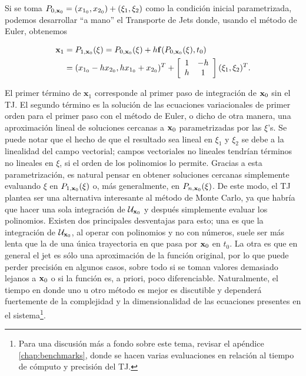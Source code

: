 Si se toma $P_{0,\mathbf{x}_0} = (x_{1_0},x_{2_0}) + (\xi_1,\xi_2)$ como la condición inicial parametrizada, podemos desarrollar ``a mano'' el Transporte de Jets donde, usando el método de Euler, obtenemos

\begin{align*}
\mathbf{x}_1 &= P_{1,\mathbf{x}_0}(\xi) = P_{0,\mathbf{x}_0}(\xi) + h \mathbf{f}(P_{0,\mathbf{x}_0}(\xi),t_0) \\
&= (x_{1_0} - h x_{2_0}, h x_{1_0} + x_{2_0} )^T + \left[ \begin{array}{cc}
 1 & -h  \\
h & 1  \\
\end{array} \right] (\xi_1,\xi_2)^T.
\end{align*} 

El primer término de $\mathbf{x}_1$ corresponde al primer paso de integración de $\mathbf{x}_0$ sin el TJ. El segundo término es la solución de las ecuaciones variacionales de primer orden para el primer paso con el método de Euler, o dicho de otra manera, una aproximación lineal de soluciones cercanas a $\mathbf{x}_0$ parametrizadas por las $\xi$'s. Se puede notar que el hecho de que el resultado sea lineal en $\xi_1$ y $\xi_2$ se debe a la linealidad del campo vectorial; campos vectoriales no lineales tendrían términos no lineales en $\xi$, si el orden de los polinomios lo permite. Gracias a esta parametrización, es natural pensar en obtener soluciones cercanas simplemente evaluando $\xi$ en $P_{1,\mathbf{x}_0}(\xi)$ o, más generalmente, en $P_{n,\mathbf{x}_0}(\xi)$. De este modo, el TJ plantea ser una alternativa interesante al método de Monte Carlo, ya que habría que hacer una sola integración de $\mathcal{U}_{\mathbf{x}_0}$ y después simplemente evaluar los polinomios. Existen dos principales desventajas para esto; una es que la integración de $\mathcal{U}_{\mathbf{x}_0}$, al operar con polinomios y no con números, suele ser más lenta que la de una única trayectoria en que pasa por $\mathbf{x}_0$ en $t_0$. La otra es que en general el jet es sólo una aproximación de la función original, por lo que puede perder precisión en algunos casos, sobre todo si se toman valores demasiado lejanos a $\mathbf{x}_0$ o si la función es, a priori, poco diferenciable. Naturalmente, el tiempo en donde uno u otro método es mejor es discutible y dependerá fuertemente de la complejidad y la dimensionalidad de las ecuaciones presentes en el sistema\footnote{Para una discusión más a fondo sobre este tema, revisar el apéndice \ref{chap:benchmarks}, donde se hacen varias evaluaciones en relación al tiempo de cómputo y precisión del TJ.}.


